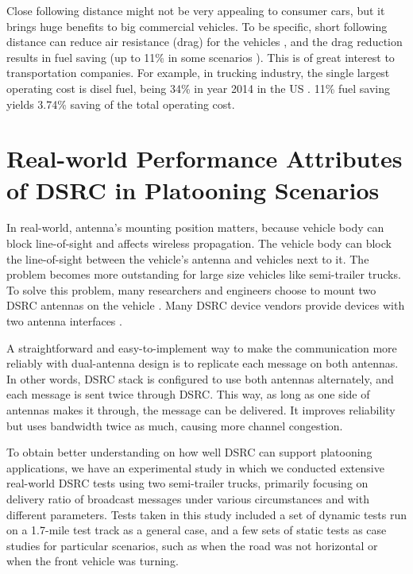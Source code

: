 \documentclass[12pt]{report}
\begin{document}
Close following distance might not be very appealing to consumer cars, but it brings huge benefits to big commercial vehicles. To be specific, short following distance can reduce air resistance (drag) for the vehicles \cite{watts2015computational}, and the drag reduction results in fuel saving (up to 11\% in some scenarios \cite{lammert2014effect}). This is of great interest to transportation companies. For example, in trucking industry, the single largest operating cost is disel fuel, being 34\% in year 2014 in the US \cite{atri2015analysis}. 11\% fuel saving yields 3.74\% saving of the total operating cost.

\section{Real-world Performance Attributes of DSRC in Platooning Scenarios}

\label{sec:background_realworld_performance}

In real-world, antenna's mounting position matters, because vehicle body can block line-of-sight and affects wireless propagation. The vehicle body can block the line-of-sight between the vehicle's antenna and vehicles next to it. The problem becomes more outstanding for large size vehicles like semi-trailer trucks. To solve this problem, many researchers and engineers choose to mount two DSRC antennas on the vehicle \cite{Bergenhem20121222,peloton}. Many DSRC device vendors provide devices with two antenna interfaces \cite{aradasystems,denso,unex}.

A straightforward and easy-to-implement way to make the communication more reliably with dual-antenna design is to replicate each message on both antennas. In other words, DSRC stack is configured to use both antennas alternately, and each message is sent twice through DSRC. This way, as long as one side of antennas makes it through, the message can be delivered. It improves reliability but uses bandwidth twice as much, causing more channel congestion.

To obtain better understanding on how well DSRC can support platooning applications, we have an experimental study in which we conducted extensive real-world DSRC tests using two semi-trailer trucks\cite{songDSRC2016}, primarily focusing on delivery ratio of broadcast messages under various circumstances and with different parameters. Tests taken in this study included a set of dynamic tests run on a 1.7-mile test track as a general case, and a few sets of static tests as case studies for particular scenarios, such as when the road was not horizontal or when the front vehicle was turning.
\end{document}

